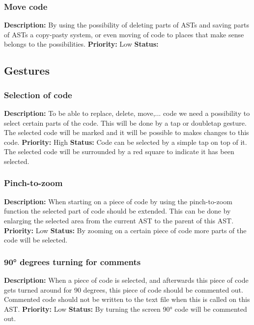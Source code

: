 \documentclass[a4paper,12pt]{report}
\begin{document}
\subsubsection{Move code}
\textbf{Description: } By using the possibility of deleting parts of ASTs and saving parts of ASTs a copy-pasty system, or even moving of code to places that make sense belongs
to the possibilities.\newline
\textbf{Priority:} Low \newline
\textbf{Status: } \newline
\subsection{Gestures}
\subsubsection{Selection of code}
\textbf{Description: } To be able to replace, delete, move,... code we need a possibility to select certain parts of the code. This will be done
by a tap or doubletap gesture. The selected code will be marked and it will be possible to makes changes to this code.\newline
\textbf{Priority:} High \newline
\textbf{Status: } Code can be selected by a simple tap on top of it. The selected code will be surrounded by a red square to indicate it has been selected. \newline
\subsubsection{Pinch-to-zoom}
\textbf{Description: }When starting on a piece of code by using the pinch-to-zoom function the selected part of code should be extended. This can be done by enlarging the selected
area from the current AST to the parent of this AST. \newline
\textbf{Priority:} Low \newline
\textbf{Status: } By zooming on a certain piece of code more parts of the code will be selected.\newline
\subsubsection{90° degrees turning for comments}
\textbf{Description: }When a piece of code is selected, and afterwards this piece of code gets turned around for 90 degrees, this piece of code should be commented out. 
Commented code should not be written to the text file when this is called on this AST. \newline
\textbf{Priority:} Low \newline
\textbf{Status: } By turning the screen 90° code will be commented out.\newline
\end{document}
